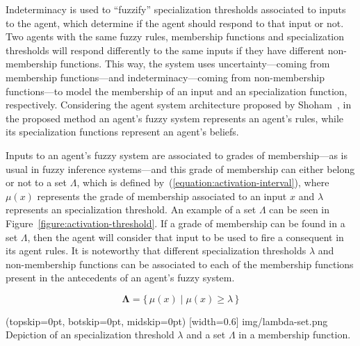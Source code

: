 \documentclass{ieeeaccess}
\begin{document}
Indeterminacy is used to ``fuzzify'' specialization thresholds associated to inputs to the agent, which determine if the agent should respond to that
input or not. Two agents with the same fuzzy rules, membership functions and specialization thresholds will respond differently to the
same inputs if they have different non-membership functions. This way, the system uses uncertainty---coming from membership functions---and
indeterminacy---coming from non-membership functions---to model the membership of an input and an specialization function, respectively. Considering the agent system architecture proposed by Shoham~\cite{Shoham1993}, in the proposed method an agent's fuzzy system represents an agent's rules, while its specialization functions represent an agent's beliefs.

Inputs to an agent's fuzzy system are associated to grades of membership---as is usual in fuzzy inference systems---and this grade of membership can either belong or not to a set $\Lambda$, which is defined by~(\ref{equation:activation-interval}), where $\mu(x)$ represents the grade of membership associated to an input $x$ and $\lambda$ represents an specialization threshold. An example of a set $\Lambda$ can be seen in Figure~\ref{figure:activation-threshold}. If a grade of membership can be found in a set $\Lambda$, then the agent will consider that input to be used to fire a consequent in its agent
rules. It is noteworthy that different specialization thresholds $\lambda$ and non-membership functions can be associated to each of the
membership functions present in the antecedents of an agent's fuzzy system.

\begin{equation}
  \label{equation:activation-interval}
  \bm{\Lambda} = \{\,\mu(x) \mid \mu(x) \geq \lambda \,\}
\end{equation}

\Figure[](topskip=0pt, botskip=0pt, midskip=0pt)
[width=0.6\linewidth]
{img/lambda-set.png}
{Depiction of an specialization threshold $\lambda$ and a set $\Lambda$ in a membership function.
  \label{figure:activation-threshold}}
\end{document}
